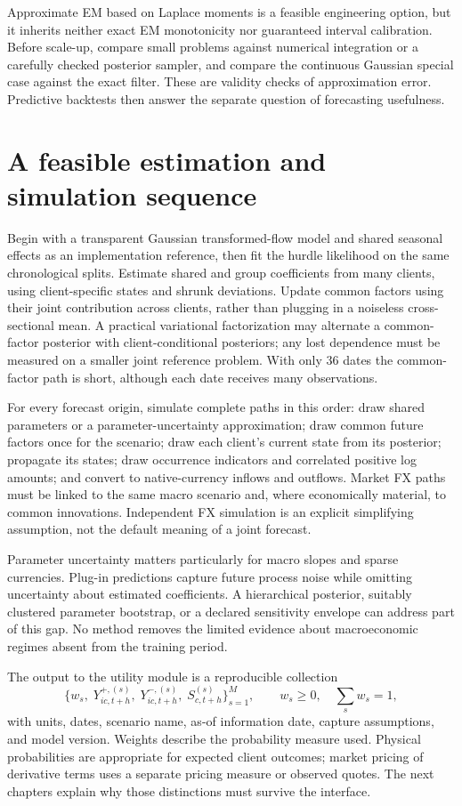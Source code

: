 Approximate EM based on Laplace moments is a feasible engineering option, but it inherits neither exact EM monotonicity nor guaranteed interval calibration. Before scale-up, compare small problems against numerical integration or a carefully checked posterior sampler, and compare the continuous Gaussian special case against the exact filter. These are validity checks of approximation error. Predictive backtests then answer the separate question of forecasting usefulness.

\section{A feasible estimation and simulation sequence}
Begin with a transparent Gaussian transformed-flow model and shared seasonal effects as an implementation reference, then fit the hurdle likelihood on the same chronological splits. Estimate shared and group coefficients from many clients, using client-specific states and shrunk deviations. Update common factors using their joint contribution across clients, rather than plugging in a noiseless cross-sectional mean. A practical variational factorization may alternate a common-factor posterior with client-conditional posteriors; any lost dependence must be measured on a smaller joint reference problem. With only 36 dates the common-factor path is short, although each date receives many observations.

For every forecast origin, simulate complete paths in this order: draw shared parameters or a parameter-uncertainty approximation; draw common future factors once for the scenario; draw each client's current state from its posterior; propagate its states; draw occurrence indicators and correlated positive log amounts; and convert to native-currency inflows and outflows. Market FX paths must be linked to the same macro scenario and, where economically material, to common innovations. Independent FX simulation is an explicit simplifying assumption, not the default meaning of a joint forecast.

Parameter uncertainty matters particularly for macro slopes and sparse currencies. Plug-in predictions capture future process noise while omitting uncertainty about estimated coefficients. A hierarchical posterior, suitably clustered parameter bootstrap, or a declared sensitivity envelope can address part of this gap. No method removes the limited evidence about macroeconomic regimes absent from the training period.

The output to the utility module is a reproducible collection
\begin{equation}
\{w_s,\;Y^{+,(s)}_{ic,t+h},\;Y^{-,(s)}_{ic,t+h},\;S^{(s)}_{c,t+h}\}_{s=1}^{M},
\qquad w_s\geq0,\quad\sum_s w_s=1,
\end{equation}
with units, dates, scenario name, as-of information date, capture assumptions, and model version. Weights describe the probability measure used. Physical probabilities are appropriate for expected client outcomes; market pricing of derivative terms uses a separate pricing measure or observed quotes. The next chapters explain why those distinctions must survive the interface.
